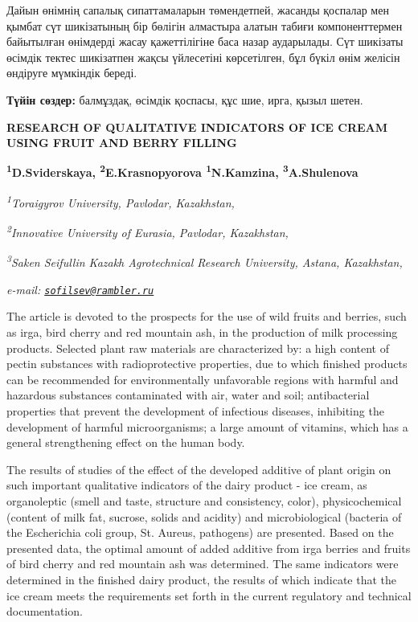 Дайын өнімнің сапалық сипаттамаларын төмендетпей, жасанды қоспалар мен
қымбат сүт шикізатының бір бөлігін алмастыра алатын табиғи
компоненттермен байытылған өнімдерді жасау қажеттілігіне баса назар
аударылады. Сүт шикізаты өсімдік тектес шикізатпен жақсы үйлесетіні
көрсетілген, бұл бүкіл өнім желісін өндіруге мүмкіндік береді.

{\bfseries Түйін сөздер:} балмұздақ, өсімдік қоспасы, құс шие, ирга, қызыл
шетен.

\begin{articleheader}
{\bfseries RESEARCH OF QUALITATIVE INDICATORS OF ICE CREAM USING FRUIT AND BERRY FILLING}

{\bfseries
\textsuperscript{1}D.Sviderskaya\textsuperscript{\envelope },
\textsuperscript{2}E.Krasnopyorova
\textsuperscript{1}N.Kamzina,
\textsuperscript{3}A.Shulenova}
\end{articleheader}

\begin{affiliation}
\emph{\textsuperscript{1}Toraigyrov University, Pavlodar, Kazakhstan,}

\emph{\textsuperscript{2}Innovative University of Eurasia, Pavlodar, Kazakhstan,}

\emph{\textsuperscript{3}Saken Seifullin Kazakh Agrotechnical Research University, Astana, Kazakhstan,}

\emph{e-mail: \href{mailto:sofilsev@rambler.ru}{\nolinkurl{sofilsev@rambler.ru}}}
\end{affiliation}

The article is devoted to the prospects for the use of wild fruits and
berries, such as irga, bird cherry and red mountain ash, in the
production of milk processing products. Selected plant raw materials are
characterized by: a high content of pectin substances with
radioprotective properties, due to which finished products can be
recommended for environmentally unfavorable regions with harmful and
hazardous substances contaminated with air, water and soil;
antibacterial properties that prevent the development of infectious
diseases, inhibiting the development of harmful microorganisms; a large
amount of vitamins, which has a general strengthening effect on the
human body.

The results of studies of the effect of the developed additive of plant
origin on such important qualitative indicators of the dairy product -
ice cream, as organoleptic (smell and taste, structure and consistency,
color), physicochemical (content of milk fat, sucrose, solids and
acidity) and microbiological (bacteria of the Escherichia coli group,
St. Aureus, pathogens) are presented. Based on the presented data, the
optimal amount of added additive from irga berries and fruits of bird
cherry and red mountain ash was determined. The same indicators were
determined in the finished dairy product, the results of which indicate
that the ice cream meets the requirements set forth in the current
regulatory and technical documentation.


